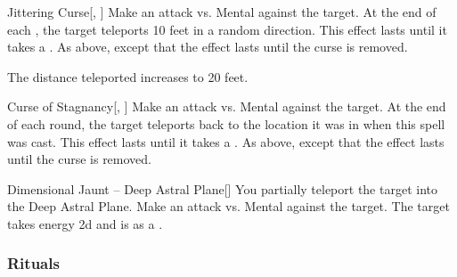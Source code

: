 \lowercase{\hypertarget{spell:Jittering Curse}{}}\label{spell:Jittering Curse}
\begin{freeability}[Rank 6]{\hypertarget{spell:Jittering Curse}{Jittering Curse}}[, ]
Make an attack vs. Mental against the target.
\hit At the end of each , the target teleports 10 feet in a random direction.
This effect lasts until it takes a .
\crit As above, except that the effect lasts until the curse is removed.

\rankline
{} The distance teleported increases to 20 feet.

\end{freeability}
\vspace{0.25em}



\lowercase{\hypertarget{spell:Curse of Stagnancy}{}}\label{spell:Curse of Stagnancy}
\begin{freeability}[Rank 8]{\hypertarget{spell:Curse of Stagnancy}{Curse of Stagnancy}}[, ]
Make an attack vs. Mental against the target.
\hit At the end of each round, the target teleports back to the location it was in
when this spell was cast.
This effect lasts until it takes a .
\crit As above, except that the effect lasts until the curse is removed.

\end{freeability}
\vspace{0.25em}



\lowercase{\hypertarget{spell:Dimensional Jaunt -- Deep Astral Plane}{}}\label{spell:Dimensional Jaunt -- Deep Astral Plane}
\begin{freeability}[Rank 8]{\hypertarget{spell:Dimensional Jaunt -- Deep Astral Plane}{Dimensional Jaunt -- Deep Astral Plane}}[]
You partially teleport the target into the Deep Astral Plane.
Make an attack vs. Mental against the target.
\hit The target takes energy  \minus2d and is  as a .

\end{freeability}
\vspace{0.25em}



\subsubsection{Rituals}


